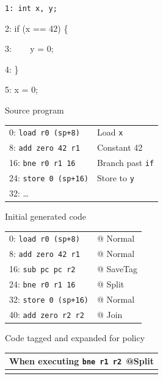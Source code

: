 \begin{figure}
  \begin{subfigure}[t]{0.22\textwidth}
    \vspace{0em}
    {\tt 1: int x, y;

    2: if (x == 42) \{

    3: ~~~ y = 0;

    4: \}

    5: x = 0;
    }

    \caption{Source program}
    \label{ch1:ex:if0}
  \end{subfigure}
  \begin{subfigure}[t]{0.42\textwidth}
    \vspace{0em}
    \begin{tabular}{l l}
      0: {\tt load r0 (sp+8)} & Load {\tt x} \\
      8: {\tt add zero 42 r1} & Constant 42 \\
      16: {\tt bne r0 r1 16} & Branch past {\tt if} \\
      24: {\tt store 0 (sp+16)} & Store to {\tt y} \\
      32: \dots & \\
    \end{tabular}
    \caption{Initial generated code}
    \label{ch1:ex:if1}
  \end{subfigure}
  \begin{subfigure}[t]{0.4\textwidth}
     \vspace{0em}
     \begin{tabular}{l l}
      0: {\tt load r0 (sp+8)} & @ {\sc Normal} \\
      8: {\tt add zero 42 r1} & @ {\sc Normal} \\
      16: {\tt sub pc pc r2} & @ {\sc SaveTag} \\
      24: {\tt bne r0 r1 16} & @ {\sc Split} \\
      32: {\tt store 0 (sp+16)} & @ {\sc Normal} \\
      40: {\tt add zero r2 r2} & @ {\sc Join} \\
    \end{tabular}
    \caption{Code tagged and expanded for policy}
    \label{ch1:ex:if2}
  \end{subfigure}
  \begin{subfigure}{\textwidth}
    \begin{tabular}{|l|}
      \hline
      When executing {\tt bne r1 r2 }@{\sc Split} \\
      \hline
      \rowcolor{blue!30}

\end{tabular}
\end{subfigure}
\end{figure}
